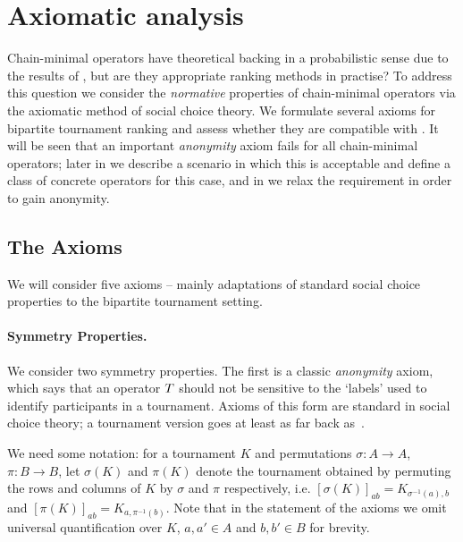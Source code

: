 \section{Axiomatic analysis}
\label{tourn_sec_axiomatic_analysis}

Chain-minimal operators have theoretical backing in a probabilistic sense due
to the results of , but are they appropriate ranking methods in
practise? To address this question we consider the \emph{normative} properties
of chain-minimal operators via the axiomatic method of social choice theory. We
formulate several axioms for bipartite tournament ranking
and assess whether they
are compatible with \chainmin{}. It will be seen that an important
\emph{anonymity} axiom fails for all chain-minimal operators; later in
 we describe a scenario in which this is
acceptable and define a class of concrete operators for this case, and in
 we relax the \chainmin{} requirement in
order to gain anonymity.

\subsection{The Axioms}

We will consider five axioms -- mainly adaptations of standard social choice
properties to the bipartite tournament setting.

\paragraph{Symmetry Properties.}
%
We consider two symmetry properties. The first is a classic \emph{anonymity}
axiom, which says that an operator $T$ should not be sensitive to the
`labels' used to identify participants in a tournament. Axioms of this form are
standard in social choice theory; a tournament version goes at least as far
back as~\cite{rubinstein1980ranking}.

We need some notation: for a tournament $K$ and permutations $\sigma: A \to A$,
$\pi: B \to B$, let $\sigma(K)$ and $\pi(K)$ denote the tournament obtained by
permuting the rows and columns of $K$ by $\sigma$ and $\pi$ respectively, i.e.
$[\sigma(K)]_{ab} = K_{\sigma^{-1}(a), b}$ and $[\pi(K)]_{ab} = K_{a,
\pi^{-1}(b)}$. Note that in the statement of the axioms we omit universal
quantification over $K$, $a, a' \in A$ and $b, b' \in B$ for
brevity.

